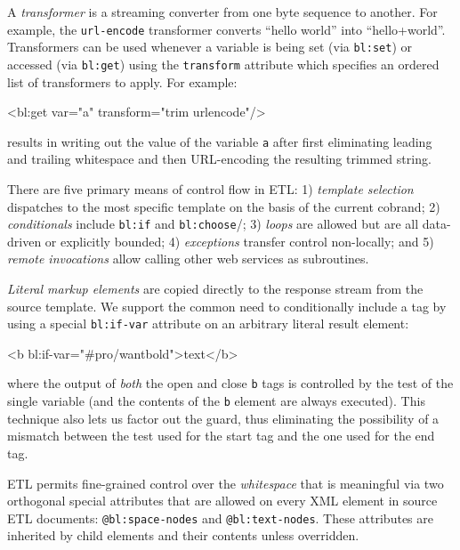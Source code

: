 \documentclass{www2003-submission}
\newcommand{\B}{\discretionary{}{}{}}
\newcommand{\smtexttt}[1]{{\small\texttt{#1}}}
\newcommand{\etl}{ETL}
\newenvironment{smallverbatim}%
{\renewcommand{\baselinestretch}{1}\small\verbatim}%
{\renewcommand{\baselinestretch}{2}\endverbatim}
\begin{document}
A \emph{transformer} is a streaming converter from one byte sequence
to another.  For example, the \smtexttt{url-encode} transformer
converts ``hello world'' into ``hello+world''.  Transformers can be
used whenever a variable is being set (via
\smtexttt{bl:set}) or accessed (via \smtexttt{bl:get}) using the
\smtexttt{transform} attribute which specifies an ordered 
list of transformers to apply.  For example:

\begin{smallverbatim}
<bl:get var="a" transform="trim urlencode"/>
\end{smallverbatim}

\noindent results in writing out the value of the variable \smtexttt{a}
after first eliminating leading and trailing whitespace and then
URL-encoding the resulting trimmed string.

There are five primary means of control flow in \etl{}: 1)
\emph{template selection} dispatches to the most specific template on
the basis of the current cobrand; 2) \emph{conditionals} include
\smtexttt{bl:if} and \smtexttt{bl:choose}/\B{}\smtexttt{bl:when}; 3)
\emph{loops} are allowed but are all data-driven or explicitly bounded; 
4) \emph{exceptions} transfer control non-locally; and 5) \emph{remote
invocations} allow calling other web services as subroutines.

\emph{Literal markup elements} are copied directly to the response
stream from the source template.  We support the common need to
conditionally include a tag by using a special
\smtexttt{bl:if-var} attribute on an arbitrary literal result element:

\begin{smallverbatim}
<b bl:if-var="#pro/wantbold">text</b>
\end{smallverbatim}

\noindent where the output of \emph{both} the open and close
\smtexttt{b} tags is controlled by the test of the single variable
(and the contents of the \smtexttt{b} element are always
executed). This technique also lets us factor out the guard, thus
eliminating the possibility of a mismatch between the test used for
the start tag and the one used for the end tag.

\etl{} permits fine-grained control over the \emph{whitespace} that is
meaningful via two orthogonal special attributes that are allowed on
every XML element in source \etl{} documents:
\smtexttt{@bl:space-nodes} and \smtexttt{@bl:text-nodes}.  These
attributes are inherited by child elements and their contents unless
overridden.
\end{document}
